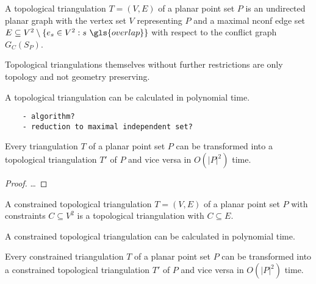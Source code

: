 
\begin{definition}
  A topological triangulation \(T=(V,E)\) of a planar point set \(P\)
  is an undirected planar graph with the vertex set \(V\) 
  representing \(P\) and a maximal \gls{nconf} edge set
  \(E \subseteq V^2 \setminus \{e_s \in V^2 : s~\gls{overlap}\}\)
  with respect to the conflict graph \(G_C(S_P)\).
  
  Topological triangulations themselves without further restrictions
  are only topology and not geometry preserving.
\end{definition}


\begin{theorem}
  A topological triangulation can be calculated in polynomial time.
  \begin{verbatim}
    - algorithm?
    - reduction to maximal independent set?
  \end{verbatim}
\end{theorem}


\begin{theorem}
  Every triangulation \(T\) of a planar point set \(P\) can be
  transformed into a topological triangulation \(T'\) of \(P\)
  and vice versa in \(O(|P|^2)\) time.
\end{theorem}

\begin{proof}
  \ldots{}
\end{proof}


\begin{definition}
  \label{def:constr_top_triangulation}
  A constrained topological triangulation \(T=(V,E)\) of a planar
  point set \(P\) with constraints \(C \subseteq V^2\) is a
  topological triangulation with \(C \subseteq E\).
\end{definition}

\begin{theorem}
  A constrained topological triangulation can be calculated in polynomial time. 
\end{theorem}

\begin{theorem}
  Every constrained triangulation \(T\) of a planar point set \(P\) can be
  transformed into a constrained topological triangulation \(T'\) of \(P\)
  and vice versa in \(O(|P|^2)\) time.
\end{theorem}

